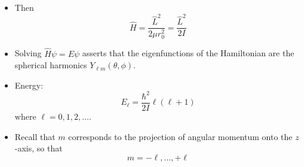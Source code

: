 \documentclass[../notes.tex]{subfiles}
\begin{document}
\begin{itemize}
\begin{itemize}
        \item Then
        \begin{equation*}
            \hat{H} = \frac{\hat{L}^2}{2\mu r_0^2} = \frac{\hat{L}^2}{2I}
        \end{equation*}
        \item Solving $\hat{H}\psi=E\psi$ asserts that the eigenfunctions of the Hamiltonian are the spherical harmonics $Y_{\ell m}(\theta,\phi)$.
        \item Energy:
        \begin{equation*}
            E_\ell = \frac{\hbar^2}{2I}\ell(\ell+1)
        \end{equation*}
        where $\ell=0,1,2,\dots$.
        \item Recall that $m$ corresponds to the projection of angular momentum onto the $z$-axis, so that
        \begin{equation*}
            m = -\ell,\dots,+\ell
        \end{equation*}
    \end{itemize}
\end{itemize}
\end{document}
